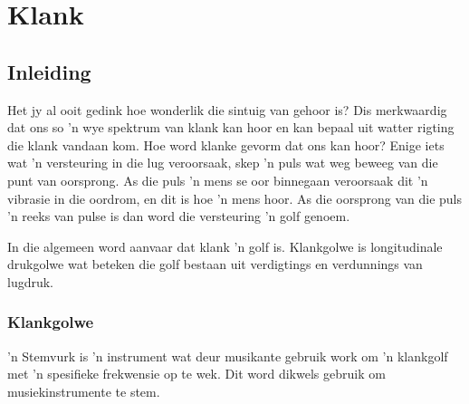 \chapter{Klank}

    \setcounter{figure}{1}
    \setcounter{subfigure}{1}
    \label{9b5d72dd5f0585e544578ab90a9956a8}
         \section{Inleiding}
    \nopagebreak
    \label{m38799*cid2}
\label{m38799*id183123}Het jy al ooit gedink hoe wonderlik die sintuig van gehoor is? Dis merkwaardig dat ons so 'n wye spektrum van klank kan hoor en kan bepaal uit watter rigting die klank vandaan kom. Hoe word klanke gevorm dat ons kan hoor? Enige iets wat 'n versteuring in die lug veroorsaak, skep 'n puls wat weg beweeg van die punt van oorsprong. As die puls 'n mens se oor binnegaan veroorsaak dit 'n vibrasie in die oordrom, en dit is hoe 'n mens hoor. As die oorsprong van die puls 'n reeks van pulse is dan word die versteuring 'n golf genoem. \par
{}

In die algemeen word aanvaar dat klank 'n golf is. Klankgolwe is longitudinale drukgolwe wat beteken die golf bestaan uit verdigtings en verdunnings van lugdruk.

\subsection*{Klankgolwe}
            \nopagebreak
 'n Stemvurk is 'n instrument wat deur musikante gebruik work om 'n klankgolf met 'n spesifieke frekwensie op te wek. Dit word dikwels gebruik om musiekinstrumente te stem.

